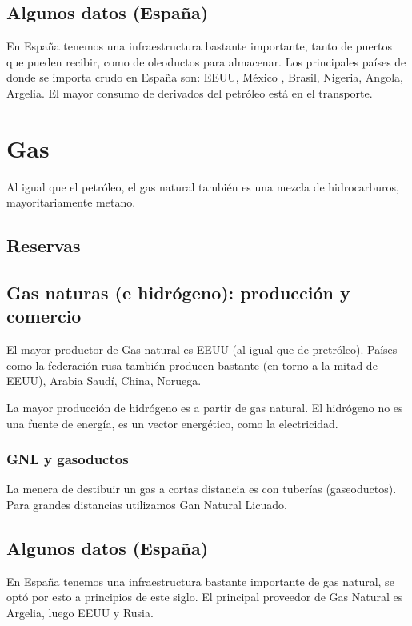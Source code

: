 \subsection{Algunos datos (España)}

En España tenemos una infraestructura bastante importante, tanto de puertos que pueden recibir, como de oleoductos para almacenar. Los principales países de donde se importa crudo en España son: EEUU, México , Brasil, Nigeria, Angola, Argelia. El mayor consumo de derivados del petróleo está en el transporte.

\section{Gas}

Al igual que el petróleo, el gas natural también es una mezcla de hidrocarburos, mayoritariamente metano.

\subsection{Reservas}

\subsection{Gas naturas (e hidrógeno): producción y comercio}

El mayor productor de Gas natural es EEUU (al igual que de pretróleo). Países como la federación rusa también producen bastante (en torno a la mitad de EEUU), Arabia Saudí, China, Noruega. 

La mayor producción de hidrógeno es a partir de gas natural. El hidrógeno no es una fuente de energía, es un vector energético, como la electricidad. 

\subsubsection{GNL y gasoductos}

La menera de destibuir un gas a cortas distancia es con tuberías (gaseoductos). Para grandes distancias utilizamos Gan Natural Licuado. 

\subsection{Algunos datos (España)}

En España tenemos una infraestructura bastante importante de gas natural, se optó por esto a principios de este siglo. El principal proveedor de Gas Natural es Argelia, luego EEUU y Rusia. 

